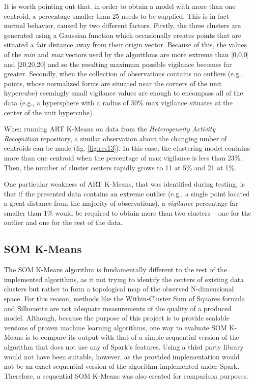 \documentclass{l4proj}
\begin{document}
It is worth pointing out that, in order to obtain a model with more than one centroid, a percentage smaller than 25 needs to be supplied. This is in fact normal behavior, caused by two different factors. Firstly, the three clusters are generated using a Gaussian function which occasionally creates points that are situated a fair distance away from their origin vector. Because of this, the values of the \textit{min} and \textit{max} vectors used by the algorithms are more extreme than [0,0,0] and [20,20,20] and so the resulting maximum possible vigilance becomes far greater. Secondly, when the collection of observations contains no outliers (e.g., points, whose normalized forms are situated near the corners of the unit hypercube) seemingly small vigilance values are enough to encompass all of the data (e.g., a hypersphere with a radius of 50\% max vigilance situates at the center of the unit hypercube).

When running ART K-Means on data from the \textit{Heterogeneity Activity Recognition} repository, a similar observation about the changing umber of centroids can be made (fig. \ref{fig:res13}). In this case, the clustering model contains more than one centroid when the percentage of max vigilance is less than 23\%. Then, the number of cluster centers rapidly grows to 11 at 5\% and 21 at 1\%.

One particular weakness of ART K-Means, that was identified during testing, is that
if the presented data contains an extreme outlier (e.g., a single point located a great distance from the majority of observations), a \textit{vigilance} percentage far smaller than 1\% would be required to obtain more than two clusters -- one for the outlier and one for the rest of the data. 

\subsection{SOM K-Means}

The SOM K-Means algorithm is fundamentally different to the rest of the implemented algorithms, as it not trying to identify the centers of existing data clusters but rather to form a topological map of the observed N-dimensional space. For this reason, methods like the Within-Cluster Sum of Squares formula and Silhouette are not adequate measurements of the quality of a produced model. Although, because the
purpose of this project is to provide scalable versions of proven machine learning algorithms, one way to evaluate SOM K-Means is to compare its output with that of a simple sequential version of the algorithm that does not use any of Spark's features. Using a third party library would not have been suitable, however, as the provided implementation would not be an exact sequential version of the algorithm implemented under Spark. Therefore, a sequential SOM K-Means was also created for comparison purposes.
\end{document}
